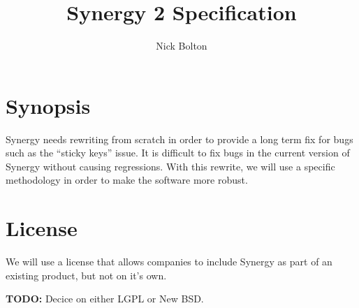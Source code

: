 \documentclass{article}
\title{Synergy 2 Specification}
\author{Nick Bolton}
\begin{document}
\maketitle
\clearpage

\section*{Synopsis}

Synergy needs rewriting from scratch in order to provide a long term fix for 
bugs such as the ``sticky keys'' issue. It is difficult to fix bugs in the
current version of Synergy without causing regressions. With this rewrite, we
will use a specific methodology in order to make the software more robust.

\section*{License}

We will use a license that allows companies to include Synergy as part of an 
existing product, but not on it's own.

\textbf{TODO:} Decice on either LGPL or New BSD.

\clearpage

\setcounter{tocdepth}{2}
\tableofcontents
\clearpage


\clearpage


\clearpage


\clearpage


\clearpage

\appendix

\end{document}
